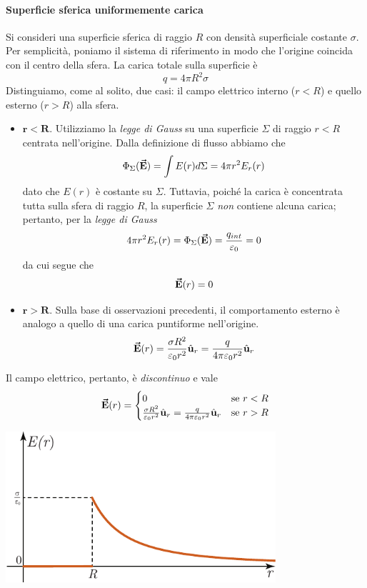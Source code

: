 \paragraph{Superficie sferica uniformemente carica}
Si consideri una superficie sferica di raggio $R$ con densità superficiale costante $\sigma$. Per semplicità, poniamo il sistema di riferimento in modo che l'origine coincida con il centro della sfera.
La carica totale sulla superficie è
\begin{equation}
	q=4\pi R^2 \sigma
\end{equation}
Distinguiamo, come al solito, due casi: il campo elettrico interno ($r<R$) e quello esterno ($r>R$) alla sfera.
\begin{itemize}
	\item $\mathbf{r<R}$. Utilizziamo la \textit{legge di Gauss} su una superficie $\Sigma$ di raggio $r<R$ centrata nell'origine. Dalla definizione di flusso abbiamo che
	\begin{equation*}
		\Phi_{\Sigma}(\vb*{\va{E}})=\int E(r)d\Sigma=4\pi r^2 E_r(r)
	\end{equation*}
dato che $E(r)$ è costante su $\Sigma$.
Tuttavia, poiché la carica è concentrata tutta sulla sfera di raggio $R$, la superficie $\Sigma$ \textit{non} contiene alcuna carica; pertanto, per la \textit{legge di Gauss}
\begin{equation*}
	4\pi r^2 E_r(r)=\Phi_{\Sigma}(\vb*{\va{E}})=\frac{q_{int}}{\varepsilon_0}=0
\end{equation*}
da cui segue che
\begin{equation}
	\vb*{\va{E}}(r)=0
\end{equation}
\item $\mathbf{r>R}$. Sulla base di osservazioni precedenti, il comportamento esterno è analogo a quello di una carica puntiforme nell'origine.
\begin{equation}
	\vb*{\va{E}}(r)=\frac{\sigma R^2}{\varepsilon_0r^2}\hat{\mathbf{u}}_r=\frac{q}{4\pi\varepsilon_0r^2}\hat{\mathbf{u}}_r
\end{equation}
\end{itemize}
Il campo elettrico, pertanto, è \textit{discontinuo} e vale
\begin{equation}
	\vb*{\va{E}}(r)=\begin{cases}
		0&\text{se}\ r< R\\
		\frac{\sigma R^2}{\varepsilon_0r^2}\hat{\mathbf{u}}_r=\frac{q}{4\pi\varepsilon_0r^2}\hat{\mathbf{u}}_r &\text{se}\ r> R
	\end{cases}
\end{equation}
\begin{center}
	\includegraphics[width=0.75\textwidth]{images/chp3sferacavagraf1.pdf}
\end{center}
